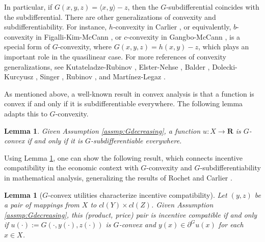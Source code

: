 \documentclass[a4paper, 11pt]{amsart}
\numberwithin{equation}{section}
\theoremstyle{plain}
\newtheorem{lemma}[theorem]{Lemma}
\theoremstyle{definition}
\theoremstyle{remark}
\newcommand{\R}{\mathbf{R}}
\begin{document}
In particular, if $G(x,y,z) = \langle x, y \rangle - z$, then the $G$-subdifferential coincides with the subdifferential. There are other generalizations of convexity and subdifferentiability. For instance, $h$-convexity in Carlier \cite{Carlier01}, or equivalently, $b$-convexity in Figalli-Kim-McCann \cite{FigalliKimMcCann11}, or $c$-convexity in  Gangbo-McCann \cite{GangboMcCann96}, is a special form of $G$-convexity, where $G(x,y,z)=  h(x,y) -z$, which plays an important role in the quasilinear case. For more references of convexity generalizations, see Kutateladze-Rubinov \cite{KutateladzeRubinov72}, Elster-Nehse \cite{ElsterNehse74}, Balder \cite{Balder77}, Dolecki-Kurcyusz \cite{DoleckiKurcyusz78},  Singer \cite{Singer97},  Rubinov \cite{Rubinov00a}, and Martínez-Legaz \cite{MartinezLegaz05}.\medskip


As mentioned above, a well-known result in convex analysis is that a function is convex if and only if it is subdifferentiable everywhere. The following lemma adapts this to $G$-convexity. 

\begin{lemma}\label{convex-subdiff}
	Given Assumption \ref{assmp:Gdecreasing}, a function $u: X \rightarrow \R$ is $G$-convex if and only if it is $G$-subdifferentiable everywhere.
\end{lemma}

Using Lemma \ref{convex-subdiff}, one can show the following result,  %
	which connects incentive compatibility in the economic context with $G$-convexity and $G$-subdifferentiability in mathematical analysis, generalizing the results of Rochet \cite{Rochet87} and Carlier \cite{Carlier01}.

\begin{lemma}[$G$-convex utilities characterize incentive compatibility]\label{incen/convex}
	Let $(y,z)$ be a pair of mappings from $X$ to $cl(Y) \times cl(Z)$. Given Assumption \ref{assmp:Gdecreasing}, this (product, price) pair is incentive compatible %
	if and only if $u(\cdot):=G(\cdot,y(\cdot),z(\cdot))$ is $G$-convex and $y(x)\in \partial^G u(x)$ for each $x \in X$.
\end{lemma}
\end{document}
